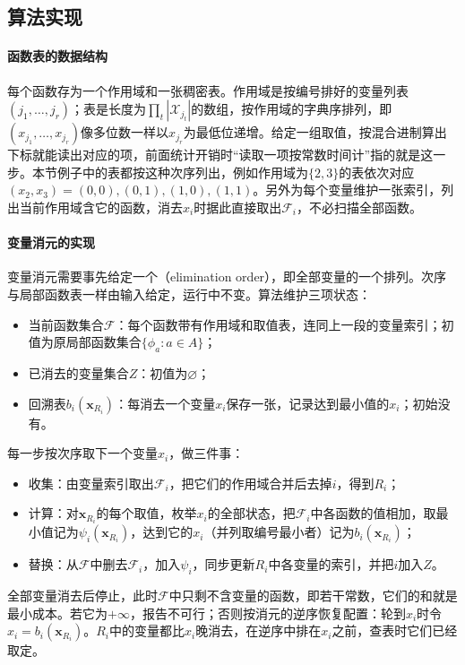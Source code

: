 \subsection{算法实现}
\label{sec:graph-dp-elimination-algorithm}

\paragraph{函数表的数据结构}
每个函数存为一个作用域和一张稠密表。作用域是按编号排好的变量列表$(j_1,\ldots,j_r)$；表是长度为$\prod_{t}|\mathcal X_{j_t}|$的数组，按作用域的字典序排列，即$(x_{j_1},\ldots,x_{j_r})$像多位数一样以$x_{j_r}$为最低位递增。给定一组取值，按混合进制算出下标就能读出对应的项，前面统计开销时“读取一项按常数时间计”指的就是这一步。本节例子中的表都按这种次序列出，例如作用域为$\{2,3\}$的表依次对应$(x_2,x_3)=(0,0),(0,1),(1,0),(1,1)$。另外为每个变量维护一张索引，列出当前作用域含它的函数，消去$x_i$时据此直接取出$\mathcal F_i$，不必扫描全部函数。

\paragraph{变量消元的实现}
变量消元需要事先给定一个（elimination order），即全部变量的一个排列。次序与局部函数表一样由输入给定，运行中不变。算法维护三项状态：
\begin{itemize}
  \item 当前函数集合$\mathcal F$：每个函数带有作用域和取值表，连同上一段的变量索引；初值为原局部函数集合$\{\phi_a:a\in A\}$；
  \item 已消去的变量集合$Z$：初值为$\varnothing$；
  \item 回溯表$b_i(\bm x_{R_i})$：每消去一个变量$x_i$保存一张，记录达到最小值的$x_i$；初始没有。
\end{itemize}
每一步按次序取下一个变量$x_i$，做三件事：
\begin{itemize}
  \item 收集：由变量索引取出$\mathcal F_i$，把它们的作用域合并后去掉$i$，得到$R_i$；
  \item 计算：对$\bm x_{R_i}$的每个取值，枚举$x_i$的全部状态，把$\mathcal F_i$中各函数的值相加，取最小值记为$\psi_i(\bm x_{R_i})$，达到它的$x_i$（并列取编号最小者）记为$b_i(\bm x_{R_i})$；
  \item 替换：从$\mathcal F$中删去$\mathcal F_i$，加入$\psi_i$，同步更新$R_i$中各变量的索引，并把$i$加入$Z$。
\end{itemize}
全部变量消去后停止，此时$\mathcal F$中只剩不含变量的函数，即若干常数，它们的和就是最小成本。若它为$+\infty$，报告不可行；否则按消元的逆序恢复配置：轮到$x_i$时令$x_i=b_i(\bm x_{R_i})$。$R_i$中的变量都比$x_i$晚消去，在逆序中排在$x_i$之前，查表时它们已经取定。

